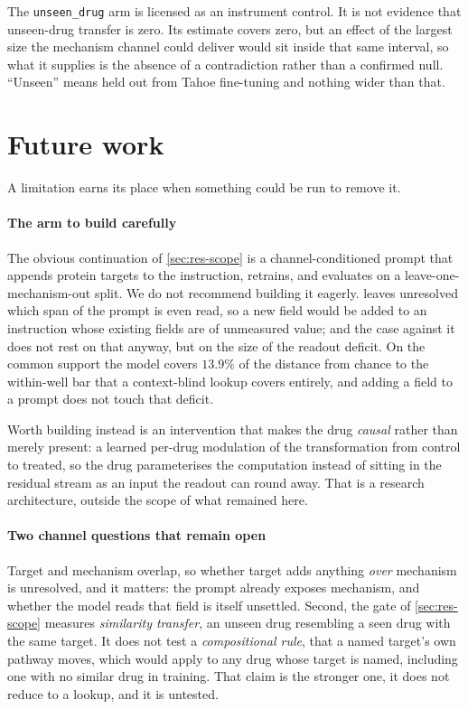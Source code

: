 \begin{scopelimit}
The \texttt{unseen\_drug} arm is licensed as an instrument control. It is not
evidence that unseen-drug transfer is zero. Its estimate covers zero, but an
effect of the largest size the mechanism channel could deliver would sit inside
that same interval, so what it supplies is the absence of a contradiction rather
than a confirmed null. ``Unseen'' means held out from Tahoe fine-tuning and
nothing wider than that.
\end{scopelimit}

\section{Future work}
\label{sec:lim-future}

A limitation earns its place when something could be run to remove it.

\paragraph{The arm to build carefully} The obvious continuation of
\cref{sec:res-scope} is a channel-conditioned prompt that appends protein targets
to the instruction, retrains, and evaluates on a leave-one-mechanism-out split.
We do not recommend building it eagerly.  leaves unresolved
which span of the prompt is even read, so a new field would be added to an
instruction whose existing fields are of unmeasured value; and the case against
it does not rest on that anyway, but on the size of the readout deficit. On the
common support the model covers $13.9\%$ of the distance from chance to the
within-well bar that a context-blind lookup covers entirely, and adding a field
to a prompt does not touch that deficit.

Worth building instead is an intervention that makes the drug \emph{causal}
rather than merely present: a learned per-drug modulation of the transformation
from control to treated, so the drug parameterises the computation instead of
sitting in the residual stream as an input the readout can round away. That is a
research architecture, outside the scope of what remained here.

\paragraph{Two channel questions that remain open} Target and mechanism overlap,
so whether target adds anything \emph{over} mechanism is unresolved, and it
matters: the prompt already exposes mechanism, and whether the model reads that
field is itself unsettled. Second, the gate of \cref{sec:res-scope}
measures \emph{similarity transfer}, an unseen drug resembling a seen drug with
the same target. It does not test a \emph{compositional rule}, that a named
target's own pathway moves, which would apply to any drug whose target is named,
including one with no similar drug in training. That claim is the stronger one,
it does not reduce to a lookup, and it is untested.

